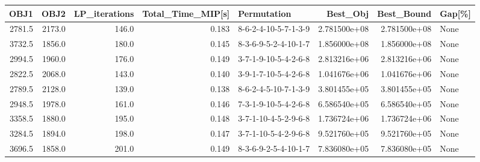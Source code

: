 \begin{tabular}{rrrrlrrl}
\toprule
   OBJ1 &    OBJ2 &  LP\_iterations &  Total\_Time\_MIP[s] &           Permutation &      Best\_Obj &    Best\_Bound & Gap[\%] \\
\midrule
 2781.5 &  2173.0 &          146.0 &              0.183 &  8-6-2-4-10-5-7-1-3-9 &  2.781500e+08 &  2.781500e+08 &   None \\
 3732.5 &  1856.0 &          180.0 &              0.145 &  8-3-6-9-5-2-4-10-1-7 &  1.856000e+08 &  1.856000e+08 &   None \\
 2994.5 &  1960.0 &          176.0 &              0.149 &  3-7-1-9-10-5-4-2-6-8 &  2.813216e+06 &  2.813216e+06 &   None \\
 2822.5 &  2068.0 &          143.0 &              0.140 &  3-9-1-7-10-5-4-2-6-8 &  1.041676e+06 &  1.041676e+06 &   None \\
 2789.5 &  2128.0 &          139.0 &              0.138 &  8-6-2-4-5-10-7-1-3-9 &  3.801455e+05 &  3.801455e+05 &   None \\
 2948.5 &  1978.0 &          161.0 &              0.146 &  7-3-1-9-10-5-4-2-6-8 &  6.586540e+05 &  6.586540e+05 &   None \\
 3358.5 &  1880.0 &          195.0 &              0.148 &  3-7-1-10-4-5-2-9-6-8 &  1.736724e+06 &  1.736724e+06 &   None \\
 3284.5 &  1894.0 &          198.0 &              0.147 &  3-7-1-10-5-4-2-9-6-8 &  9.521760e+05 &  9.521760e+05 &   None \\
 3696.5 &  1858.0 &          201.0 &              0.149 &  8-3-6-9-2-5-4-10-1-7 &  7.836080e+05 &  7.836080e+05 &   None \\
\bottomrule
\end{tabular}
